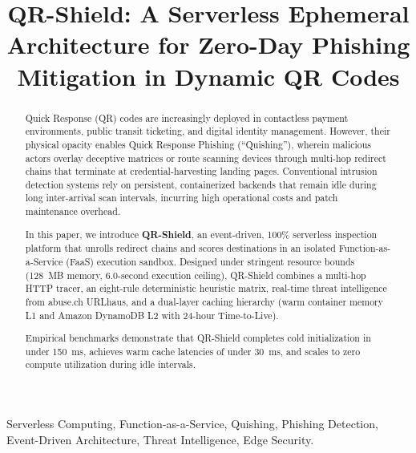 \documentclass[10pt,conference,letterpaper]{IEEEtran}
\begin{document}
\title{QR-Shield: A Serverless Ephemeral Architecture for Zero-Day Phishing Mitigation in Dynamic QR Codes}

\author{
}

\maketitle

\begin{abstract}
Quick Response (QR) codes are increasingly deployed in contactless payment environments, public transit ticketing, and digital identity management. However, their physical opacity enables Quick Response Phishing (``Quishing''), wherein malicious actors overlay deceptive matrices or route scanning devices through multi-hop redirect chains that terminate at credential-harvesting landing pages. Conventional intrusion detection systems rely on persistent, containerized backends that remain idle during long inter-arrival scan intervals, incurring high operational costs and patch maintenance overhead. 

In this paper, we introduce \textbf{QR-Shield}, an event-driven, 100\% serverless inspection platform that unrolls redirect chains and scores destinations in an isolated Function-as-a-Service (FaaS) execution sandbox. Designed under stringent resource bounds (128~MB memory, 6.0-second execution ceiling), QR-Shield combines a multi-hop HTTP tracer, an eight-rule deterministic heuristic matrix, real-time threat intelligence from abuse.ch URLhaus, and a dual-layer caching hierarchy (warm container memory L1 and Amazon DynamoDB L2 with 24-hour Time-to-Live). 

Empirical benchmarks demonstrate that QR-Shield completes cold initialization in under 150~ms, achieves warm cache latencies of under 30~ms, and scales to zero compute utilization during idle intervals.
\end{abstract}

\begin{IEEEkeywords}
Serverless Computing, Function-as-a-Service, Quishing, Phishing Detection, Event-Driven Architecture, Threat Intelligence, Edge Security.
\end{IEEEkeywords}
\end{document}
